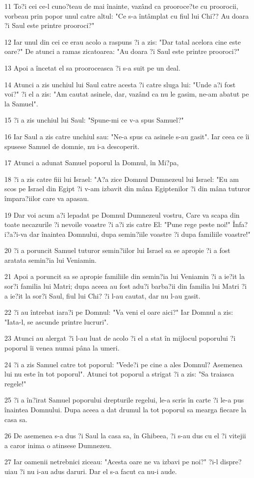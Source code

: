 \par 11 To?i cei ce-l cuno?teau de mai înainte, vazând ca prooroce?te cu proorocii, vorbeau prin popor unul catre altul: "Ce s-a întâmplat cu fiul lui Chi?? Au doara ?i Saul este printre prooroci?"
\par 12 Iar unul din cei ce erau acolo a raspuns ?i a zis: "Dar tatal acelora cine este oare?" De atunci a ramas zicatoarea: "Au doara ?i Saul este printre prooroci?"
\par 13 Apoi a încetat el sa prooroceasca ?i s-a suit pe un deal.
\par 14 Atunci a zis unchiul lui Saul catre acesta ?i catre sluga lui: "Unde a?i fost voi?" ?i el a zis: "Am cautat asinele, dar, vazând ca nu le gasim, ne-am abatut pe la Samuel".
\par 15 ?i a zis unchiul lui Saul: "Spune-mi ce v-a spus Samuel?"
\par 16 Iar Saul a zis catre unchiul sau: "Ne-a spus ca asinele s-au gasit". Iar ceea ce îi spusese Samuel de domnie, nu i-a descoperit.
\par 17 Atunci a adunat Samuel poporul la Domnul, în Mi?pa,
\par 18 ?i a zis catre fiii lui Israel: "A?a zice Domnul Dumnezeul lui Israel: "Eu am scos pe Israel din Egipt ?i v-am izbavit din mâna Egiptenilor ?i din mâna tuturor împara?iilor care va apasau.
\par 19 Dar voi acum a?i lepadat pe Domnul Dumnezeul vostru, Care va scapa din toate necazurile ?i nevoile voastre ?i a?i zis catre El: "Pune rege peste noi!" Înfa?i?a?i-va dar înaintea Domnului, dupa semin?iile voastre ?i dupa familiile voastre!"
\par 20 ?i a poruncit Samuel tuturor semin?iilor lui Israel sa se apropie ?i a fost aratata semin?ia lui Veniamin.
\par 21 Apoi a poruncit sa se apropie familiile din semin?ia lui Veniamin ?i a ie?it la sor?i familia lui Matri; dupa aceea au fost adu?i barba?ii din familia lui Matri ?i a ie?it la sor?i Saul, fiul lui Chi? ?i l-au cautat, dar nu l-au gasit.
\par 22 ?i au întrebat iara?i pe Domnul: "Va veni el oare aici?" Iar Domnul a zis: "Iata-l, se ascunde printre lucruri".
\par 23 Atunci au alergat ?i l-au luat de acolo ?i el a stat în mijlocul poporului ?i poporul îi venea numai pâna la umeri.
\par 24 ?i a zis Samuel catre tot poporul: "Vede?i pe cine a ales Domnul? Asemenea lui nu este în tot poporul". Atunci tot poporul a strigat ?i a zis: "Sa traiasca regele!"
\par 25 ?i a în?irat Samuel poporului drepturile regelui, le-a scris în carte ?i le-a pus înaintea Domnului. Dupa aceea a dat drumul la tot poporul sa mearga fiecare la casa sa.
\par 26 De asemenea s-a dus ?i Saul la casa sa, în Ghibeea, ?i s-au dus cu el ?i vitejii a caror inima o atinsese Dumnezeu.
\par 27 Iar oamenii netrebnici ziceau: "Acesta oare ne va izbavi pe noi?" ?i-l dispre?uiau ?i nu i-au adus daruri. Dar el s-a facut ca nu-i aude.

